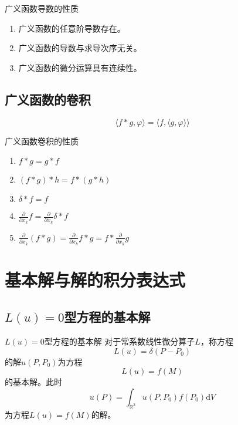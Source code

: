 \documentclass[lang = cn, scheme = chinese, thmcnt = section]{elegantbook}
\newcommand{\R}{\mathbb{R}}            %
\newcommand{\dd}{\mathrm{d}}           %
\newcommand{\dis}{\displaystyle}
\begin{document}
\begin{proposition}{广义函数导数的性质}
	\begin{enumerate}
		\item 广义函数的任意阶导数存在。
		\item 广义函数的导数与求导次序无关。
		\item 广义函数的微分运算具有连续性。
	\end{enumerate}
\end{proposition}

\subsection{广义函数的卷积}

\begin{theorem}
	$$
	\langle f*g,\varphi \rangle=
	\langle f,\langle g,\varphi \rangle \rangle
	$$
\end{theorem}

\begin{proposition}{广义函数卷积的性质}
	\begin{enumerate}
		\item $f*g=g*f$
		\item $(f*g)*h=f*(g*h)$
		\item $\delta*f=f$
		\item $\dis\frac{\partial}{\partial x_k}f=\frac{\partial}{\partial x_k}\delta *f$
		\item $\dis\frac{\partial}{\partial x_k}(f*g)=\frac{\partial}{\partial x_k}f*g=f*\frac{\partial}{\partial x_k}g$
	\end{enumerate}
\end{proposition}

\section{基本解与解的积分表达式}

\subsection{$L(u)=0$型方程的基本解}

\begin{definition}{$L(u)=0$型方程的基本解}
	对于常系数线性微分算子$L$，称方程%
	$$
	L(u)=\delta(P-P_0)
	$$
	的解$u(P,P_0)$为方程%
	$$
	L(u)=f(M)
	$$
	的基本解。此时%
	$$
	u(P)=\int_{\R^3}u(P,P_0)f(P_0)\dd V
	$$
	为方程$L(u)=f(M)$的解。
\end{definition}
\end{document}
